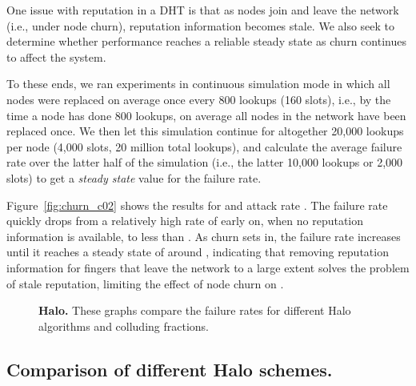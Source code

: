 One issue with reputation in a DHT is that as nodes join and leave the
network (i.e., under node churn), reputation information becomes
stale. 
We also seek to determine whether \sys performance reaches a reliable
steady state as churn continues to affect the system.


To these ends, we ran \hsys experiments in continuous simulation mode in
which all nodes were replaced on average once every 800 lookups (160
slots), i.e., by the time a node has done 800 lookups, on average all
nodes in the network have been replaced once. We then let this
simulation continue for altogether 20,000 lookups per node (4,000 slots,
20 million total lookups), and calculate the average failure rate over
the latter half of the simulation (i.e., the latter 10,000 lookups or
2,000 slots) to get a \emph{steady state} value for the failure rate.



Figure~\ref{fig:churn_c02} shows the results for  and attack
rate .  The failure rate quickly drops from a relatively high
rate of  early on, when no reputation information is available, to
less than . As churn sets in, the failure rate increases until it
reaches a steady state of around , indicating that removing
reputation information for fingers that leave the network to a large
extent solves the problem of stale reputation, limiting the effect of
node churn on \sys.



\begin{figure}[t]
  \centering {}
\caption{{\bf Halo.} These graphs compare the failure rates
    for different Halo algorithms and colluding fractions.}
  \label{fig:failure_rate}
\end{figure}

\subsection{Comparison of different Halo schemes.}
\label{sec:eval-schemes}

